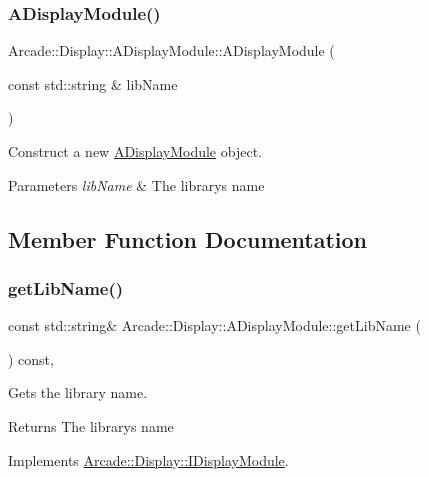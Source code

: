 \subsubsection{\texorpdfstring{ADisplayModule()}{ADisplayModule()}}
{\footnotesize\ttfamily Arcade\+::\+Display\+::\+A\+Display\+Module\+::\+A\+Display\+Module (\begin{DoxyParamCaption}\item[{const std\+::string \&}]{lib\+Name }\end{DoxyParamCaption})}



Construct a new \mbox{\hyperlink{classArcade_1_1Display_1_1ADisplayModule}{A\+Display\+Module}} object. 


\begin{DoxyParams}{Parameters}
{\em lib\+Name} & The library\textquotesingle{}s name \\
\hline
\end{DoxyParams}


\subsection{Member Function Documentation}
\mbox{\label{classArcade_1_1Display_1_1ADisplayModule_a0f7d98b279058994f41978b17bb14222}} 
\subsubsection{\texorpdfstring{getLibName()}{getLibName()}}
{\footnotesize\ttfamily const std\+::string\& Arcade\+::\+Display\+::\+A\+Display\+Module\+::get\+Lib\+Name (\begin{DoxyParamCaption}{ }\end{DoxyParamCaption}) const\hspace{0.3cm}{\ttfamily [final]}, {\ttfamily [virtual]}}



Gets the library name. 

\begin{DoxyReturn}{Returns}
The library\textquotesingle{}s name 
\end{DoxyReturn}


Implements \mbox{\hyperlink{classArcade_1_1Display_1_1IDisplayModule_a0d8e957815e94766bdefbd7a5043e81a}{Arcade\+::\+Display\+::\+I\+Display\+Module}}.

